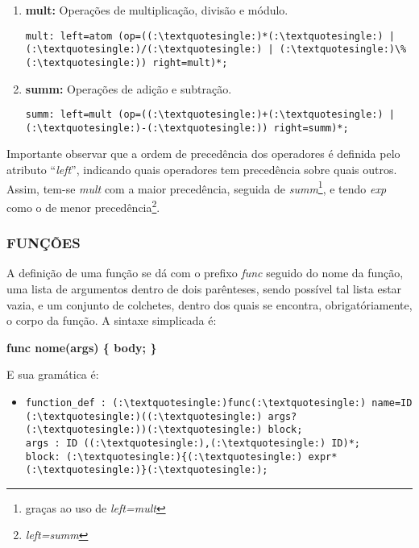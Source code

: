 \begin{itemize}
\begin{enumerate}
                \item \textbf{mult:} Operações de multiplicação, divisão e módulo.
                    \begin{lstlisting}
mult: left=atom (op=((:\textquotesingle:)*(:\textquotesingle:) | (:\textquotesingle:)/(:\textquotesingle:) | (:\textquotesingle:)\%(:\textquotesingle:)) right=mult)*;
                    \end{lstlisting}

                \item \textbf{summ:} Operações de adição e subtração.
                    \begin{lstlisting}
summ: left=mult (op=((:\textquotesingle:)+(:\textquotesingle:) | (:\textquotesingle:)-(:\textquotesingle:)) right=summ)*;
                    \end{lstlisting}
            \end{enumerate}

            Importante observar que a ordem de precedência dos operadores é definida pelo atributo ``\textit{left}'', indicando quais operadores tem precedência sobre quais outros. Assim, tem-se \textit{mult} com a maior precedência, seguida de \textit{summ}\footnote{graças ao uso de \textit{left=mult}}, e tendo \textit{exp} como o de menor precedência\footnote{\textit{left=summ}}.

        \subsubsection{\normalsize FUNÇÕES}
            A definição de uma função se dá com o prefixo \textit{func} seguido do nome da função, uma lista de argumentos dentro de dois parênteses, sendo possível tal lista estar vazia, e um conjunto de colchetes, dentro dos quais se encontra, obrigatóriamente, o corpo da função. A sintaxe simplicada é:

            \textbf{func nome(args) \{
                body;
            \}}

            E sua gramática é:
            \begin{itemize}
            \item[ ]
            \begin{lstlisting}
function_def : (:\textquotesingle:)func(:\textquotesingle:) name=ID (:\textquotesingle:)((:\textquotesingle:) args? (:\textquotesingle:))(:\textquotesingle:) block;
args : ID ((:\textquotesingle:),(:\textquotesingle:) ID)*;
block: (:\textquotesingle:){(:\textquotesingle:) expr* (:\textquotesingle:)}(:\textquotesingle:);            
            \end{lstlisting}
            \end{itemize}


\end{itemize}
